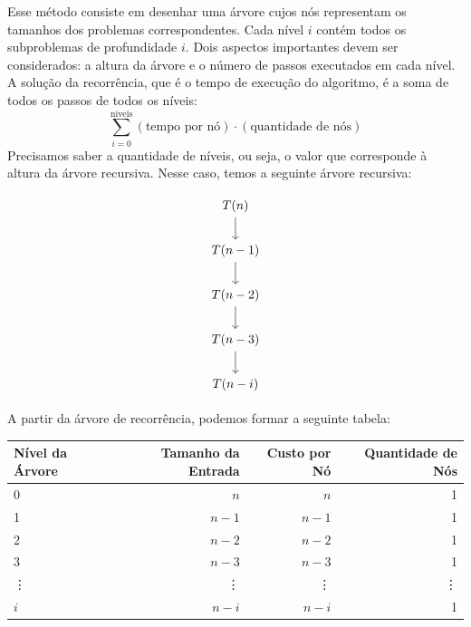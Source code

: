 \begin{enumerate}
	      Esse método consiste em desenhar uma árvore cujos nós representam os tamanhos dos problemas correspondentes. Cada nível \( i \) contém todos os subproblemas de profundidade \( i \). Dois aspectos importantes devem ser considerados: a altura da árvore e o número de passos executados em cada nível. A solução da recorrência, que é o tempo de execução do algoritmo, é a soma de todos os passos de todos os níveis:
	      \[
		      \sum_{i=0}^{\text{niveis}} (\text{tempo por nó}) \cdot (\text{quantidade de nós})
	      \]
	      Precisamos saber a quantidade de níveis, ou seja, o valor que corresponde à altura da árvore recursiva. Nesse caso, temos a seguinte árvore recursiva:

	      \[\begin{tikzcd}
			      {T(n)} \\
			      {T(n-1)} \\
			      {T(n-2)} \\
			      {T(n-3)} \\
			      {T(n-i)}
			      \arrow[from=1-1, to=2-1]
			      \arrow[from=2-1, to=3-1]
			      \arrow[from=3-1, to=4-1]
			      \arrow[from=4-1, to=5-1]
		      \end{tikzcd}\]

	      A partir da árvore de recorrência, podemos formar a seguinte tabela:

	      \begin{table}[h!]
		      \centering
		      \begin{tabular}{lrrr}
			      \toprule
			      Nível da Árvore & Tamanho da Entrada & Custo por Nó & Quantidade de Nós \\
			      \midrule
			      0               & \( n \)            & \( n \)      & 1                 \\
			      1               & \( n-1 \)          & \( n-1 \)    & 1                 \\
			      2               & \( n-2 \)          & \( n-2 \)    & 1                 \\
			      3               & \( n-3 \)          & \( n-3 \)    & 1                 \\
			      \vdots          & \vdots             & \vdots       & \vdots            \\
			      \( i \)         & \( n-i \)          & \( n-i \)    & 1                 \\
			      \bottomrule
		      \end{tabular}
	      \end{table}


\end{enumerate}
